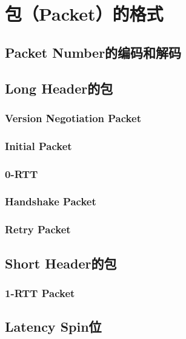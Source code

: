\section{包（Packet）的格式}
\subsection{Packet Number的编码和解码}

\subsection{Long Header的包}

\subsubsection{Version Negotiation Packet}
\label{subsubsec:version-negotiation-packet}
\subsubsection{Initial Packet}
\subsubsection{0-RTT}
\subsubsection{Handshake Packet}
\subsubsection{Retry Packet}

\subsection{Short Header的包}

\subsubsection{1-RTT Packet}

\subsection{Latency Spin位}